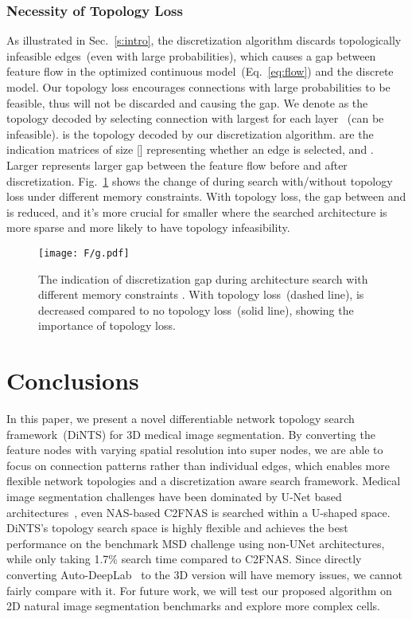 \documentclass[final]{cvpr}
\begin{document}
\subsubsection{Necessity of Topology Loss}
As illustrated in Sec.~\ref{s:intro}, the discretization algorithm discards topologically infeasible edges~(even with large probabilities), which causes a gap between feature flow in the optimized continuous model~(Eq.~\ref{eq:flow})
and the discrete model. Our topology loss encourages connections with large probabilities to be feasible, thus will not be discarded and causing the gap. 
We denote  as the topology decoded by selecting connection  with largest  for each layer ~(can be infeasible).  is the topology decoded by our discretization algorithm.  are the indication matrices of size [] representing whether an edge is selected, and . Larger  represents larger gap between the feature flow before and after discretization. Fig.~\ref{fig:g} shows the change of  during search with/without topology loss under different memory constraints. With topology loss, the gap between  and  is reduced, and it's more crucial for smaller  where the searched architecture is more sparse and more likely to have topology infeasibility. 
\begin{figure}
\begin{center}
\texttt{[image: F/g.pdf]}
\end{center}
  \caption{The indication  of discretization gap during architecture search with different memory constraints . With topology loss~(dashed line),   is decreased compared to no topology loss~(solid line), showing the importance of topology loss.}
\label{fig:g}
\end{figure}


\section{Conclusions}
In this paper, we present a novel differentiable network topology search framework~(DiNTS) for 3D medical image segmentation. By converting the feature nodes with varying spatial resolution into super nodes, we are able to focus on connection patterns rather than individual edges, which enables more flexible network topologies and a discretization aware search framework. Medical image segmentation challenges have been dominated by U-Net based architectures~\cite{isensee2019nnunet}, even NAS-based C2FNAS is searched within a U-shaped space. DiNTS's topology search space is highly flexible and achieves the best performance on the benchmark MSD challenge using non-UNet architectures, while only taking 1.7\% search time compared to C2FNAS. Since directly converting Auto-DeepLab~\cite{liu2019auto} to the 3D version will have memory issues, we cannot fairly compare with it. For future work, we will test our proposed algorithm on 2D natural image segmentation benchmarks and explore more complex cells.
{\small


}
\end{document}
